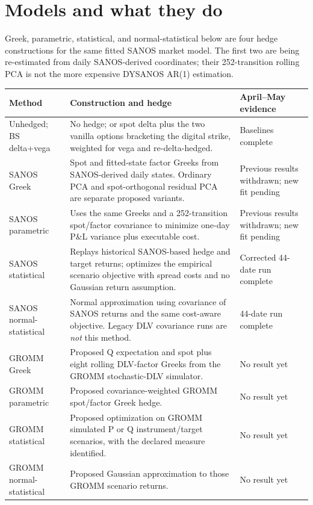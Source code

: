 \documentclass[10pt]{article}
\begin{document}
\section{Models and what they do}

Greek, parametric, statistical, and normal-statistical below are four hedge
constructions for the same fitted SANOS market model. The first two are being
re-estimated from daily SANOS-derived coordinates; their 252-transition
rolling PCA is not the more expensive DYSANOS AR(1) estimation.

\begin{tabularx}{\linewidth}{@{}p{28mm}X p{29mm}@{}}
\toprule
Method & Construction and hedge & April--May evidence \\
\midrule
Unhedged; BS delta+vega & No hedge; or spot delta plus the two vanilla options
bracketing the digital strike, weighted for vega and re-delta-hedged. & Baselines complete \\
SANOS Greek & Spot and fitted-state factor Greeks from SANOS-derived daily
states. Ordinary PCA and spot-orthogonal residual PCA are separate proposed
variants. & Previous results withdrawn; new fit pending \\
SANOS parametric & Uses the same Greeks and a 252-transition spot/factor
covariance to minimize one-day P\&L variance plus executable cost. & Previous
results withdrawn; new fit pending \\
SANOS statistical & Replays historical SANOS-based hedge and target returns;
optimizes the empirical scenario objective with spread costs and no Gaussian
return assumption. & Corrected 44-date run complete \\
SANOS normal-statistical & Normal approximation using covariance of
SANOS returns and the same cost-aware objective. Legacy DLV covariance runs
are \emph{not} this method. & 44-date run complete \\
GROMM Greek & Proposed Q expectation and spot plus eight rolling DLV-factor
Greeks from the GROMM stochastic-DLV simulator. & No result yet \\
GROMM parametric & Proposed covariance-weighted GROMM spot/factor Greek hedge.
& No result yet \\
GROMM statistical & Proposed optimization on GROMM simulated P or Q
instrument/target scenarios, with the declared measure identified. & No result yet \\
GROMM normal-statistical & Proposed Gaussian approximation to those GROMM
scenario returns. & No result yet \\

\end{tabularx}
\end{document}

